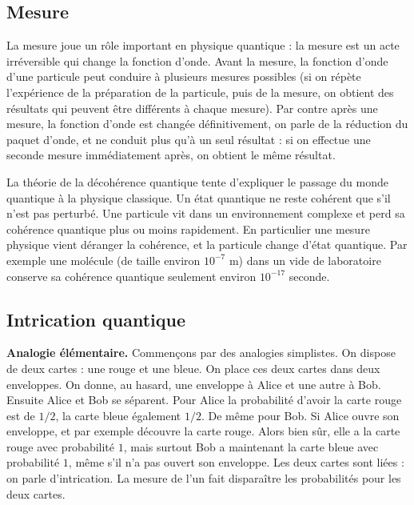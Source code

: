 \documentclass[11pt,class=report,crop=false]{standalone}
\begin{document}
\subsection{Mesure}



La mesure joue un rôle important en physique quantique : la mesure est un acte irréversible qui change la fonction d'onde.
Avant la mesure, la fonction d'onde d'une particule peut conduire à plusieurs mesures possibles (si on répète l'expérience de la préparation de la particule, puis de la mesure, on obtient des résultats qui peuvent être différents à chaque mesure).
Par contre après une mesure, la fonction d'onde est changée définitivement, on parle de la \og{}réduction du paquet d'onde\fg{}, et ne conduit plus qu'à un seul résultat : si on effectue une seconde mesure immédiatement après, on obtient le même résultat.

La théorie de la décohérence quantique tente d'expliquer le passage du monde quantique à la physique classique.
Un état quantique ne reste \og{}cohérent\fg{} que s'il n'est pas perturbé. Une particule vit dans un environnement complexe et perd sa cohérence quantique plus ou moins rapidement. En particulier une mesure physique vient déranger la cohérence, et la particule change d'état quantique.
Par exemple une molécule (de taille environ $10^{-7}$ m) dans un vide de laboratoire conserve sa cohérence quantique seulement environ $10^{-17}$ seconde.


\subsection{Intrication quantique}


\textbf{Analogie élémentaire.}
Commençons par des analogies simplistes. On dispose de deux cartes : une rouge et une bleue. On place ces deux cartes dans deux enveloppes. On donne, au hasard, une enveloppe à Alice et une autre à Bob. Ensuite Alice et Bob se séparent. Pour Alice la probabilité d'avoir la carte rouge est de $1/2$, la carte bleue également $1/2$. De même pour Bob. Si Alice ouvre son enveloppe, et par exemple découvre la carte rouge. Alors bien sûr, elle a la carte rouge avec probabilité $1$, mais surtout Bob a maintenant la carte bleue avec probabilité $1$, même s'il n'a pas ouvert son enveloppe.
Les deux cartes sont liées : on parle d'intrication. La mesure de l'un fait disparaître les probabilités pour les deux cartes.
\end{document}
